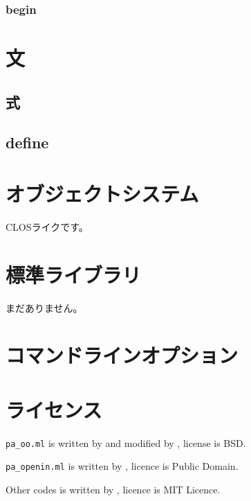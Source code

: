 \documentclass{article}
\begin{document}
\subsubsection{begin}

\section{文}
\subsection{式}

\subsection{define}

\section{オブジェクトシステム}
CLOSライクです。

\section{標準ライブラリ}
まだありません。

\section{コマンドラインオプション}

\section{ライセンス}
\verb!pa_oo.ml! is written by  and modified by
, license is BSD.

\verb!pa_openin.ml! is written by , licence is Public Domain.

Other codes is written by , licence is MIT Licence.
\end{document}
